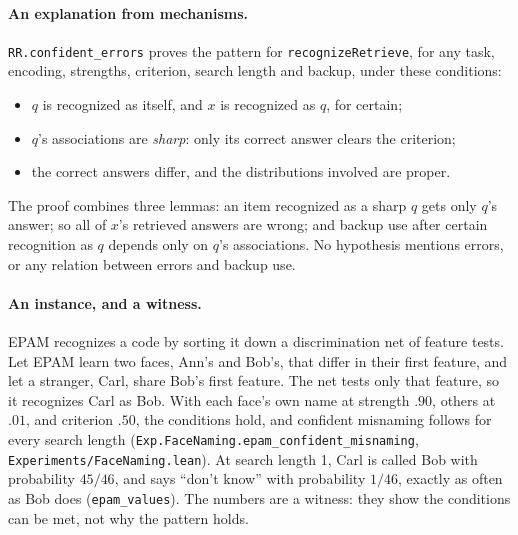 \documentclass[11pt]{article}
\newcommand{\code}[1]{\texttt{#1}}
\newcommand{\lean}[1]{\texttt{#1}}
\begin{document}
\paragraph{An explanation from mechanisms.} \lean{RR.confident\_errors} proves the pattern for \code{recognizeRetrieve}, for any task, encoding, strengths, criterion, search length and backup, under these conditions:
\begin{itemize}
  \item $q$ is recognized as itself, and $x$ is recognized as $q$, for certain;
  \item $q$'s associations are \emph{sharp}: only its correct answer clears the criterion;
  \item the correct answers differ, and the distributions involved are proper.
\end{itemize}
The proof combines three lemmas: an item recognized as a sharp $q$ gets only $q$'s answer; so all of $x$'s retrieved answers are wrong; and backup use after certain recognition as $q$ depends only on $q$'s associations. No hypothesis mentions errors, or any relation between errors and backup use.

\paragraph{An instance, and a witness.} EPAM \citep{feigenbaum1959,feigenbaum1962} recognizes a code by sorting it down a discrimination net of feature tests. Let EPAM learn two faces, Ann's and Bob's, that differ in their first feature, and let a stranger, Carl, share Bob's first feature. The net tests only that feature, so it recognizes Carl as Bob. With each face's own name at strength $.90$, others at $.01$, and criterion $.50$, the conditions hold, and confident misnaming follows for every search length (\lean{Exp.FaceNaming.epam\_confident\_misnaming}, \code{Experiments/FaceNaming.lean}). At search length 1, Carl is called Bob with probability $45/46$, and says ``don't know'' with probability $1/46$, exactly as often as Bob does (\lean{epam\_values}). The numbers are a witness: they show the conditions can be met, not why the pattern holds.
\end{document}
